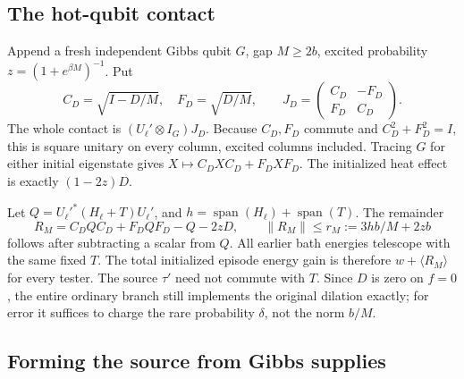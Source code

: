 \documentclass[11pt]{article}
\theoremstyle{definition}
\theoremstyle{remark}
\begin{document}
\subsection{The hot-qubit contact}
Append a fresh independent Gibbs qubit \(G\), gap \(M\ge2b\), excited
probability \(z=(1+e^{\beta M})^{-1}\). Put
\[
 C_D=\sqrt{I-D/M},\quad F_D=\sqrt{D/M},\qquad
 J_D=\begin{pmatrix}C_D&-F_D\\F_D&C_D\end{pmatrix}.
\]
The whole contact is \((U_\ell'\otimes I_G)J_D\).
Because \(C_D,F_D\) commute and \(C_D^2+F_D^2=I\), this is square
unitary on every column, excited columns included. Tracing \(G\)
for either initial eigenstate gives
\(X\mapsto C_DXC_D+F_DXF_D\). The initialized heat effect is exactly
\((1-2z)D\).

Let \(Q=U_\ell'^*(H_\ell+T)U_\ell'\), and
\(h=\operatorname{span}(H_\ell)+\operatorname{span}(T)\).
The remainder
\[
 R_M=C_DQC_D+F_DQF_D-Q-2zD,\qquad
 \|R_M\|\le r_M:=3hb/M+2zb                            \tag{E11}
\]
follows after subtracting a scalar from \(Q\).
All earlier bath energies telescope with the same fixed \(T\).
The total initialized episode energy gain is therefore
\(w+\langle R_M\rangle\) for every tester.
The source \(\tau'\) need not commute with \(T\).
Since \(D\) is zero on \(f=0\), the entire ordinary branch still
implements the original dilation exactly; for error it suffices
to charge the rare probability \(\delta\), not the norm \(b/M\).

\subsection{Forming the source from Gibbs supplies}
\end{document}
